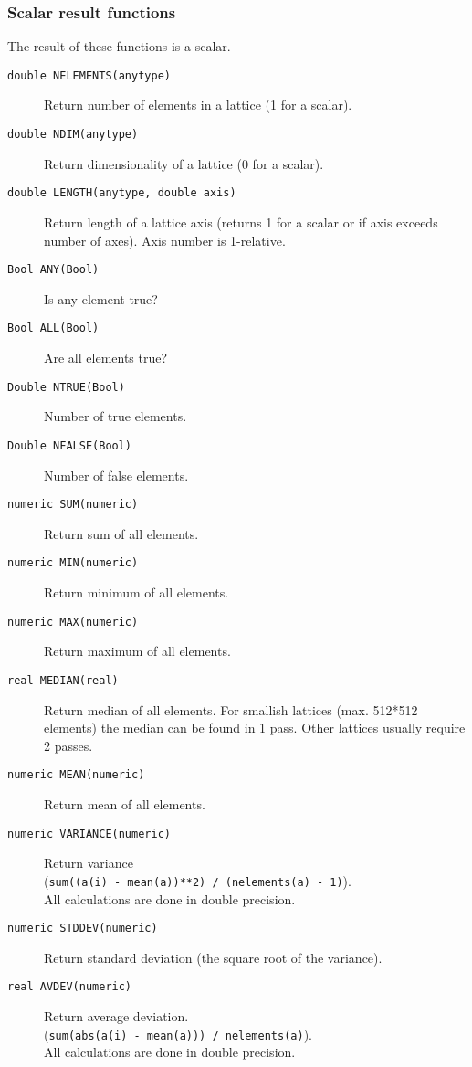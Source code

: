 \subsubsection{Scalar result functions}
The result of these functions is a scalar.
\begin{description}
  \item[ \texttt{double NELEMENTS(anytype)}]
    Return number of elements in a lattice (1 for a scalar).
  \item[ \texttt{double NDIM(anytype)}]
    Return dimensionality of a lattice (0 for a scalar).
  \item[ \texttt{double LENGTH(anytype, double axis)}]
    Return length of a lattice axis (returns 1 for a scalar or if axis
    exceeds number of axes). Axis number is 1-relative.
  \item[ \texttt{Bool ANY(Bool)}] Is any element true?
  \item[ \texttt{Bool ALL(Bool)}] Are all elements true?
  \item[ \texttt{Double NTRUE(Bool)}] Number of true elements.
  \item[ \texttt{Double NFALSE(Bool)}] Number of false elements.
  \item[ \texttt{numeric SUM(numeric)}] Return sum of all elements.
  \item[ \texttt{numeric MIN(numeric)}] Return minimum
    of all elements.
  \item[ \texttt{numeric MAX(numeric)}] Return maximum
    of all elements.
  \item[ \texttt{real MEDIAN(real)}]
    Return median of all elements. For smallish lattices
    (max. 512*512 elements) the median can be found in 1 pass.
    Other lattices usually require 2 passes.
  \item[ \texttt{numeric MEAN(numeric)}]
    Return mean of all elements.
  \item[ \texttt{numeric VARIANCE(numeric)}]
    Return variance
    \\(\texttt{sum((a(i) - mean(a))**2) / (nelements(a) - 1)}).
    \\All calculations are done in double precision.
  \item[ \texttt{numeric STDDEV(numeric)}]
    Return standard deviation (the square root of the variance).
  \item[ \texttt{real AVDEV(numeric)}]
    Return average deviation.
    \\(\texttt{sum(abs(a(i) - mean(a))) / nelements(a)}).
    \\All calculations are done in double precision.
\end{description}


